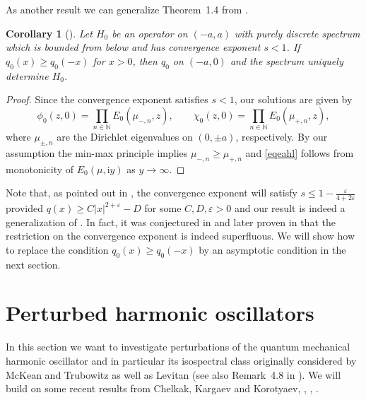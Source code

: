 \documentclass{amsart}
\newtheorem{corollary}[theorem]{Corollary}
\numberwithin{equation}{section}
\begin{document}
As another result we can generalize Theorem~1.4 from \cite{gs2}.

\begin{corollary}[\cite{gs2}]
Let $H_0$ be an operator on $(-a,a)$ with purely discrete spectrum which is bounded from below and has convergence exponent $s<1$.
If $q_0(x)\ge q_0(-x)$ for $x> 0$, then $q_0$ on $(-a,0)$ and the spectrum uniquely determine $H_0$.
\end{corollary}

\begin{proof}
Since the convergence exponent satisfies $s<1$, our solutions are given by
\[
\phi_0(z,0)= \prod_{n\in{{\mathbb N}}} E_0(\mu_{-,n},z), \qquad \chi_0(z,0)= \prod_{n\in{{\mathbb N}}} E_0(\mu_{+,n},z),
\]
where $\mu_{\pm,n}$ are the Dirichlet eigenvalues on $(0,\pm a)$, respectively.
By our assumption the min-max principle implies $\mu_{-,n} \ge \mu_{+,n}$ and \eqref{eqeahl} follows from monotonicity of
$E_0(\mu,{\mathrm{i}} y)$ as $y\to\infty$.
\end{proof}

Note that, as pointed out in \cite[Proposition~5.1]{gs2}, the convergence exponent will satisfy $s\le 1-\frac{\varepsilon}{4+2{\varepsilon}}$
provided $q(x) \ge C |x|^{2+{\varepsilon}} - D$ for some $C,D,{\varepsilon}>0$ and our result is indeed a generalization of \cite[Theorem~1.4]{gs2}.
In fact, it was conjectured in \cite{gs2} and later proven in \cite{kh} that the restriction on the convergence exponent is
indeed superfluous. We will show how to replace the condition $q_0(x)\ge q_0(-x)$ by an asymptotic condition in the
next section.

\section{Perturbed harmonic oscillators}\label{secPQHO}
\label{sec:pho}

In this section we want to investigate perturbations of the quantum mechanical harmonic oscillator and in
particular its isospectral class originally considered by McKean and Trubowitz \cite{mktr} as well as Levitan \cite{le}
(see also Remark~4.8 in \cite{gst}).
We will build on some recent results from Chelkak, Kargaev and Korotyaev, \cite{chelkak}, \cite{ckk}, \cite{ckk2}.
\end{document}
